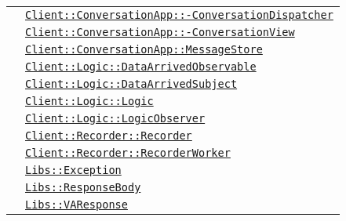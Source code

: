 \begin{longtable}{|>{\centering}m{3cm}|m{10cm}<{\centering}|}
& \hyperref[Client::ConversationApp::ConversationDispatcher]{\texttt{Client::ConversationApp::-\linebreak ConversationDispatcher}}\\
& \hyperref[Client::ConversationApp::ConversationView]{\texttt{Client::ConversationApp::-\linebreak ConversationView}}\\
& \hyperref[Client::ConversationApp::MessageStore]{\texttt{Client::ConversationApp::MessageStore}}\\
& \hyperref[Client::Logic::DataArrivedObservable]{\texttt{Client::Logic::DataArrivedObservable}}\\
& \hyperref[Client::Logic::DataArrivedSubject]{\texttt{Client::Logic::DataArrivedSubject}}\\
& \hyperref[Client::Logic::Logic]{\texttt{Client::Logic::Logic}}\\
& \hyperref[Client::Logic::LogicObserver]{\texttt{Client::Logic::LogicObserver}}\\
& \hyperref[Client::Recorder::Recorder]{\texttt{Client::Recorder::Recorder}}\\
& \hyperref[Client::Recorder::RecorderWorker]{\texttt{Client::Recorder::RecorderWorker}}\\
& \hyperref[Libs::Exception]{\texttt{Libs::Exception}}\\
& \hyperref[Libs::ResponseBody]{\texttt{Libs::ResponseBody}}\\
& \hyperref[Libs::VAResponse]{\texttt{Libs::VAResponse}}\\ \hline


\end{longtable}
